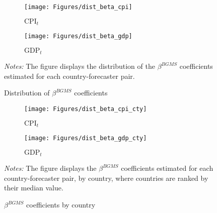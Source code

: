 
\begin{figure}[H]
	
	\begin{subfigure}[b]{0.48\textwidth}
		\centering
		\texttt{[image: Figures/dist\_beta\_cpi]}
		\caption{$\text{CPI}_t$ }
		\label{fig:dist_beta_cpi}
	\end{subfigure}
	\hfill
	\begin{subfigure}[b]{0.48\textwidth}
		\centering
		\texttt{[image: Figures/dist\_beta\_gdp]}
		\caption{$\text{GDP}_t$ }
		\label{fig:dist_beta_gdp}
	\end{subfigure}
	\caption{Distribution of $\beta^{BGMS}$ coefficients}
	\label{app:fig:dist_beta}
	\begin{fignote}
		\textit{Notes:} The figure displays the distribution of the $\beta^{BGMS}$ coefficients estimated for each country-forecaster pair.
	\end{fignote}
\end{figure}

\begin{figure}[H]
	
	\begin{subfigure}[b]{0.48\textwidth}
		\centering
		\texttt{[image: Figures/dist\_beta\_cpi\_cty]}
		\caption{$\text{CPI}_t$ }
		\label{fig:dist_beta_cpi_cty}
	\end{subfigure}
	\hfill
	\begin{subfigure}[b]{0.48\textwidth}
		\centering
		\texttt{[image: Figures/dist\_beta\_gdp\_cty]}
		\caption{$\text{GDP}_t$ }
		\label{fig:dist_beta_gdp_cty}
	\end{subfigure}
	\caption{$\beta^{BGMS}$ coefficients by country}
	\label{app:fig:dist_beta_cty}
	\begin{fignote}
		\textit{Notes:} The figure displays the $\beta^{BGMS}$ coefficients estimated for each country-forecaster pair, by country, where countries are ranked by their median value.
	\end{fignote}
\end{figure}





